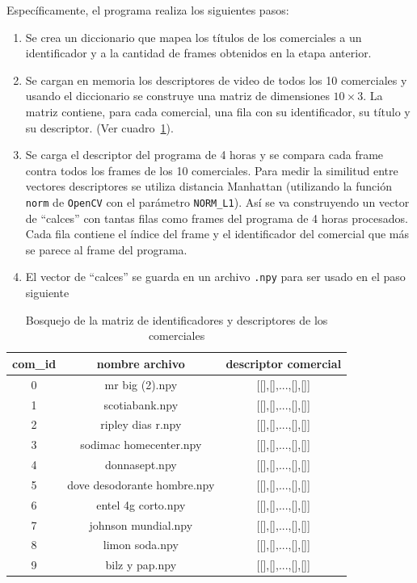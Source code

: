 \documentclass[14pt,letterpaper,hidelinks]{extarticle}
\begin{document}
Específicamente, el programa realiza los siguientes pasos:
\begin{enumerate}
\item Se crea un diccionario que mapea los títulos de los comerciales a un identificador y a la cantidad de frames obtenidos en la etapa anterior.
\item Se cargan en memoria los descriptores de video de todos los 10 comerciales y usando el diccionario se construye una matriz de dimensiones $10\times 3$. La matriz contiene, para cada comercial, una fila con su identificador, su título y su descriptor. (Ver cuadro~\ref{tab:descsCom}). 
\item Se carga el descriptor del programa de 4 horas y se compara cada frame contra todos los frames de los 10 comerciales. Para medir la similitud entre vectores descriptores se utiliza distancia Manhattan (utilizando la función \verb+norm+ de \verb+OpenCV+ con el parámetro \verb+NORM_L1+). Así se va construyendo un vector de ``calces'' con tantas filas como frames del programa de 4 horas procesados. Cada fila contiene el índice del frame y el identificador del comercial que más se parece al frame del programa.
\item El vector de ``calces'' se guarda en un archivo \verb+.npy+ para ser usado en el paso siguiente   
\end{enumerate} 
\begin{table}[ht!]
\centering
\begin{tabular}{@{}ccc@{}}
\toprule
com\_id & nombre archivo & descriptor comercial \\ \midrule
0 & mr big (2).npy & {[}{[}{]},{[}{]},...,{[}{]},{[}{]}{]} \\
1 & scotiabank.npy & {[}{[}{]},{[}{]},...,{[}{]},{[}{]}{]} \\
2 & ripley dias r.npy & {[}{[}{]},{[}{]},...,{[}{]},{[}{]}{]} \\
3 & sodimac homecenter.npy & {[}{[}{]},{[}{]},...,{[}{]},{[}{]}{]} \\
4 & donnasept.npy & {[}{[}{]},{[}{]},...,{[}{]},{[}{]}{]} \\
5 & dove desodorante hombre.npy & {[}{[}{]},{[}{]},...,{[}{]},{[}{]}{]} \\
6 & entel 4g corto.npy & {[}{[}{]},{[}{]},...,{[}{]},{[}{]}{]} \\
7 & johnson mundial.npy & {[}{[}{]},{[}{]},...,{[}{]},{[}{]}{]} \\
8 & limon soda.npy & {[}{[}{]},{[}{]},...,{[}{]},{[}{]}{]} \\
9 & bilz y pap.npy & {[}{[}{]},{[}{]},...,{[}{]},{[}{]}{]} \\ \bottomrule
\end{tabular}
\captionsetup{justification=centering,margin=2cm}
\caption{Bosquejo de la matriz de identificadores y descriptores de los comerciales \label{tab:descsCom}}
\end{table}
\end{document}

